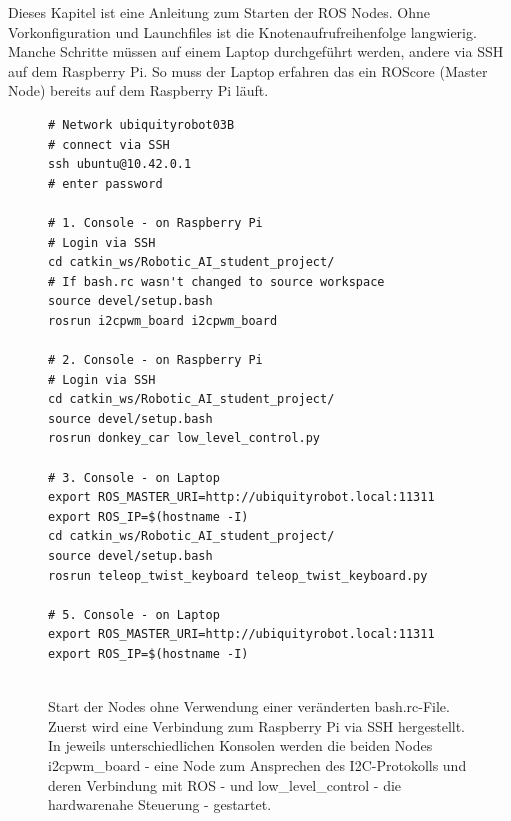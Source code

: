 \documentclass[conference]{IEEEtran}
\begin{document}
	Dieses Kapitel ist eine Anleitung zum Starten der ROS Nodes. Ohne 
	Vorkonfiguration und Launchfiles ist 
	die Knotenaufrufreihenfolge langwierig. Manche Schritte müssen auf einem 
	Laptop durchgeführt werden, andere via SSH auf dem Raspberry Pi. So 
	muss der Laptop erfahren das ein ROScore (Master Node) bereits auf dem 
	Raspberry Pi läuft.
	
\begin{figure}
	\centering
\begin{verbatim}
# Network ubiquityrobot03B
# connect via SSH
ssh ubuntu@10.42.0.1
# enter password
	
# 1. Console - on Raspberry Pi
# Login via SSH
cd catkin_ws/Robotic_AI_student_project/
# If bash.rc wasn't changed to source workspace
source devel/setup.bash
rosrun i2cpwm_board i2cpwm_board
	
# 2. Console - on Raspberry Pi
# Login via SSH
cd catkin_ws/Robotic_AI_student_project/
source devel/setup.bash
rosrun donkey_car low_level_control.py
	
# 3. Console - on Laptop 
export ROS_MASTER_URI=http://ubiquityrobot.local:11311
export ROS_IP=$(hostname -I)
cd catkin_ws/Robotic_AI_student_project/
source devel/setup.bash
rosrun teleop_twist_keyboard teleop_twist_keyboard.py
	
# 5. Console - on Laptop
export ROS_MASTER_URI=http://ubiquityrobot.local:11311
export ROS_IP=$(hostname -I)
	
	\end{verbatim}
	\label{StartNodes}
	\caption{Start der Nodes ohne Verwendung einer veränderten 
	bash.rc-File. Zuerst wird eine Verbindung zum Raspberry Pi via SSH 
	hergestellt. In jeweils unterschiedlichen Konsolen werden die beiden 
	Nodes i2cpwm\_board - eine Node zum Ansprechen des I2C-Protokolls und 
	deren Verbindung mit ROS - und low\_level\_control - die hardwarenahe 
	Steuerung - gestartet.}
\end{figure}
	
\end{document}
